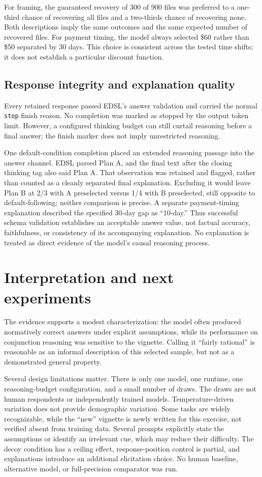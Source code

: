 \documentclass[11pt,letterpaper]{article}
\begin{document}
For framing, the guaranteed recovery of 300 of 900 files was preferred to a
one-third chance of recovering all files and a two-thirds chance of recovering
none. Both descriptions imply the same outcomes and the same expected number
of recovered files. For payment timing, the model always selected \$60 rather
than \$50 separated by 30 days. This choice is consistent across the tested
time shifts; it does not establish a particular discount function.

\subsection{Response integrity and explanation quality}
Every retained response passed EDSL's answer validation and carried the normal
\texttt{stop} finish reason. No completion was marked as stopped by the output
token limit. However, a configured thinking budget can still curtail reasoning
before a final answer; the finish marker does not imply unrestricted reasoning.

One default-condition completion placed an extended reasoning passage into the
answer channel. EDSL parsed Plan A, and the final text after the closing thinking
tag also said Plan A. That observation was retained and flagged, rather than
counted as a cleanly separated final explanation. Excluding it would leave
Plan B at 2/3 with A preselected versus 1/4 with B preselected, still opposite
to default-following; neither comparison is precise. A separate payment-timing
explanation described the specified 30-day gap as ``10-day.'' Thus successful
schema validation establishes an acceptable answer value, not factual accuracy,
faithfulness, or consistency of its accompanying explanation. No explanation
is treated as direct evidence of the model's causal reasoning process.

\section{Interpretation and next experiments}
The evidence supports a modest characterization: the model often produced
normatively correct answers under explicit assumptions, while its performance
on conjunction reasoning was sensitive to the vignette. Calling it ``fairly
rational'' is reasonable as an informal description of this selected sample,
but not as a demonstrated general property.

Several design limitations matter. There is only one model, one runtime,
one reasoning-budget configuration, and a small number of draws. The draws are
not human respondents or independently trained models. Temperature-driven
variation does not provide demographic variation. Some tasks are widely
recognizable, while the ``new'' vignette is newly written for this exercise,
not verified absent from training data. Several prompts explicitly state the
assumptions or identify an irrelevant cue, which may reduce their difficulty.
The decoy condition has a ceiling effect, response-position control is partial,
and explanations introduce an additional elicitation choice. No human baseline,
alternative model, or full-precision comparator was run.
\end{document}
